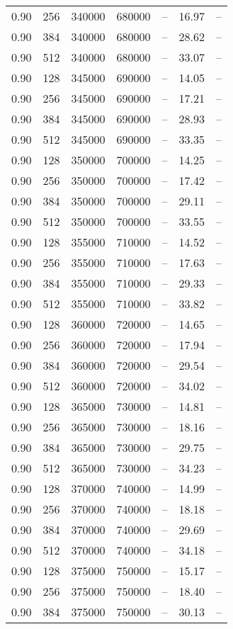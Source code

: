 \begin{tabular}{l|l|l|l|l|l|l}
0.90 & 256 & 340000 & 680000 & -- & 16.97 & --\\
0.90 & 384 & 340000 & 680000 & -- & 28.62 & --\\
0.90 & 512 & 340000 & 680000 & -- & 33.07 & --\\
0.90 & 128 & 345000 & 690000 & -- & 14.05 & --\\
0.90 & 256 & 345000 & 690000 & -- & 17.21 & --\\
0.90 & 384 & 345000 & 690000 & -- & 28.93 & --\\
0.90 & 512 & 345000 & 690000 & -- & 33.35 & --\\
0.90 & 128 & 350000 & 700000 & -- & 14.25 & --\\
0.90 & 256 & 350000 & 700000 & -- & 17.42 & --\\
0.90 & 384 & 350000 & 700000 & -- & 29.11 & --\\
0.90 & 512 & 350000 & 700000 & -- & 33.55 & --\\
0.90 & 128 & 355000 & 710000 & -- & 14.52 & --\\
0.90 & 256 & 355000 & 710000 & -- & 17.63 & --\\
0.90 & 384 & 355000 & 710000 & -- & 29.33 & --\\
0.90 & 512 & 355000 & 710000 & -- & 33.82 & --\\
0.90 & 128 & 360000 & 720000 & -- & 14.65 & --\\
0.90 & 256 & 360000 & 720000 & -- & 17.94 & --\\
0.90 & 384 & 360000 & 720000 & -- & 29.54 & --\\
0.90 & 512 & 360000 & 720000 & -- & 34.02 & --\\
0.90 & 128 & 365000 & 730000 & -- & 14.81 & --\\
0.90 & 256 & 365000 & 730000 & -- & 18.16 & --\\
0.90 & 384 & 365000 & 730000 & -- & 29.75 & --\\
0.90 & 512 & 365000 & 730000 & -- & 34.23 & --\\
0.90 & 128 & 370000 & 740000 & -- & 14.99 & --\\
0.90 & 256 & 370000 & 740000 & -- & 18.18 & --\\
0.90 & 384 & 370000 & 740000 & -- & 29.69 & --\\
0.90 & 512 & 370000 & 740000 & -- & 34.18 & --\\
0.90 & 128 & 375000 & 750000 & -- & 15.17 & --\\
0.90 & 256 & 375000 & 750000 & -- & 18.40 & --\\
0.90 & 384 & 375000 & 750000 & -- & 30.13 & --\\

\end{tabular}
